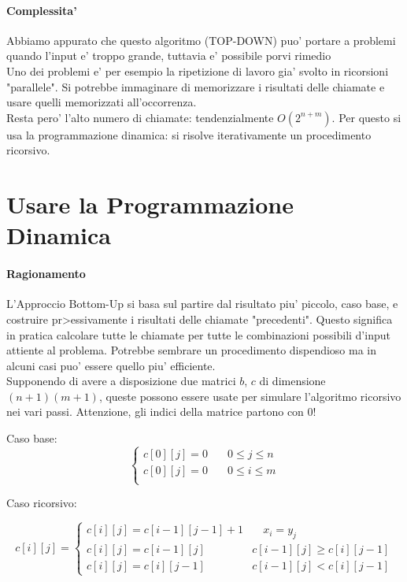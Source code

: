 \paragraph{Complessita'}

Abbiamo appurato che questo algoritmo (TOP-DOWN) puo' portare a problemi quando l'input e' troppo grande, tuttavia e' possibile porvi rimedio \\

Uno dei problemi e' per esempio la ripetizione di lavoro gia' svolto in ricorsioni "parallele".
Si potrebbe immaginare di memorizzare i risultati delle chiamate e usare quelli memorizzati all'occorrenza. \\
Resta pero' l'alto numero di chiamate: tendenzialmente $O(2^{n + m})$.
Per questo si usa la programmazione dinamica: si risolve iterativamente un procedimento ricorsivo.

\section{Usare la Programmazione Dinamica}

\paragraph{Ragionamento}

L'Approccio Bottom-Up si basa sul partire dal risultato piu' piccolo, caso base, e costruire pr>essivamente i risultati delle chiamate "precedenti".
Questo significa in pratica calcolare tutte le chiamate per tutte le combinazioni possibili d'input attiente al problema.
Potrebbe sembrare un procedimento dispendioso ma in alcuni casi puo' essere quello piu' efficiente. \\

Supponendo di avere a disposizione due matrici $b$, $c$ di dimensione $(n+1)(m+1)$, queste possono essere usate per simulare l'algoritmo ricorsivo nei vari passi.
Attenzione, gli indici della matrice partono con 0!

Caso base:
\[
    \begin{cases} 
        \text{$c[0][j]$} = 0 & \quad \text{$0 \leq j \leq n$} \\
        \text{$c[0][j]$} = 0 & \quad \text{$0 \leq i \leq m$} \\
    \end{cases}
\]

Caso ricorsivo:

\[
    c[i][j] =
    \begin{cases} 
        \text{$c[i][j] = c[i-1][j-1]$} + 1 & \quad \text{$x_{i} = y_{j}$} \\
        \text{$c[i][j] = c[i-1][j]$} \quad & \text{$c[i-1][j] \geq c[i][j-1]$} \\
        \text{$c[i][j] = c[i][j-1]$} \quad & \text{$c[i-1][j] < c[i][j-1]$}
    \end{cases}
\]

